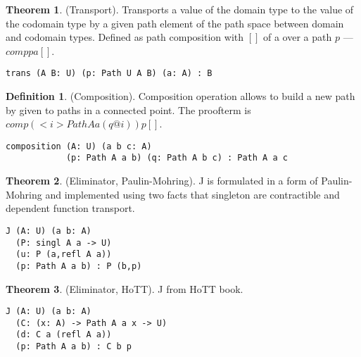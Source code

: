 \documentclass{article}
\theoremstyle{definition}
\newtheorem{definition}{Definition}
\newtheorem{theorem}{Theorem}
\begin{document}
\begin{theorem} (Transport).
Transports a value of the domain type to the value of the codomain type
by a given path element of the path space between domain and codomain types.
Defined as path composition with $[]$ of a over a path $p$ --- $comp p a []$.
\begin{lstlisting}
trans (A B: U) (p: Path U A B) (a: A) : B
\end{lstlisting}
\end{theorem}

\begin{definition} (Composition).
Composition operation allows to build a new path by given to paths
in a connected point. The proofterm is $comp (<i>Path A a (q@i)) p []$.
\begin{center}
\end{center}
\begin{lstlisting}
composition (A: U) (a b c: A)
            (p: Path A a b) (q: Path A b c) : Path A a c
\end{lstlisting}
\end{definition}

\begin{theorem} (Eliminator, Paulin-Mohring).
J is formulated in a form of Paulin-Mohring and implemented using
two facts that singleton are contractible and dependent function
transport.
\begin{lstlisting}
J (A: U) (a b: A)
  (P: singl A a -> U)
  (u: P (a,refl A a))
  (p: Path A a b) : P (b,p)
\end{lstlisting}
\end{theorem}

\begin{theorem} (Eliminator, HoTT).
J from HoTT book.
\begin{lstlisting}
J (A: U) (a b: A)
  (C: (x: A) -> Path A a x -> U)
  (d: C a (refl A a))
  (p: Path A a b) : C b p
\end{lstlisting}
\end{theorem}
\end{document}
